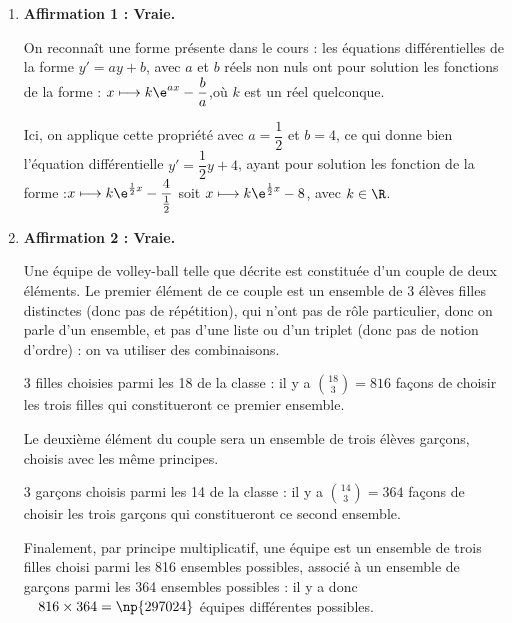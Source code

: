 \medskip

\begin{enumerate}
	\item \textbf{Affirmation 1 : Vraie.}

	
	
	

	On reconnaît une forme présente dans le cours : les équations différentielles de la forme $y' = ay + b$, avec $a$ et $b$ réels non nuls ont pour solution les fonctions de la forme : \quad $x \longmapsto k\e^{ax} - \dfrac{b}{a}$,\quad où $k$ est un réel quelconque.

	Ici, on applique cette propriété avec $a = \dfrac{1}{2}$ et $b = 4$, ce qui donne bien l'équation différentielle $y' = \dfrac{1}{2}y + 4$, ayant pour solution les fonction de la forme :\quad$x \longmapsto k\e^{\frac{1}{2}x} - \dfrac{4}{\frac{1}{2}}$ soit $x \longmapsto k\e^{\frac{1}{2}x} - 8$, avec $k\in \R$.

	
	
		
		
		
		
		
		
		
			
			
			
			
			
			
		
		
		
		

	\item \textbf{Affirmation 2 : Vraie.}

	Une équipe de volley-ball telle que décrite est constituée d'un couple de deux éléments. Le premier élément de ce couple est un ensemble de 3 élèves filles distinctes (donc pas de répétition), qui n'ont pas de rôle particulier, donc on parle d'un ensemble, et pas d'une liste ou d'un triplet (donc pas de notion d'ordre) : on va utiliser des combinaisons.

	3 filles choisies parmi les 18 de la classe : il y a $\displaystyle \binom{18}{3} = 816$ façons de choisir les trois filles qui constitueront ce premier ensemble.

	Le deuxième élément du couple sera un ensemble de trois élèves garçons, choisis avec les même principes.

	3 garçons choisis parmi les 14 de la classe : il y a $\displaystyle \binom{14}{3} = 364$ façons de choisir les trois garçons qui constitueront ce second ensemble.

	Finalement, par principe multiplicatif, une équipe est un ensemble de trois filles choisi parmi les 816 ensembles possibles, associé à un ensemble de garçons parmi les 364 ensembles possibles : il y a donc $\quad816 \times 364 = \np{297024}$ équipes différentes possibles.


\end{enumerate}
